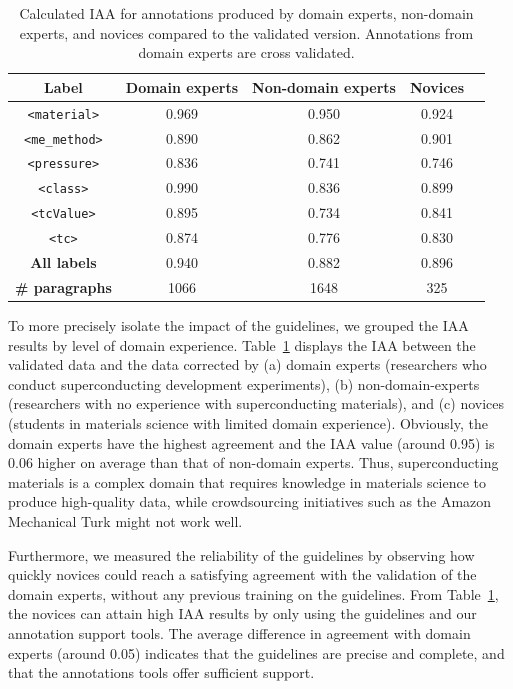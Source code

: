 \begin{table}[htbp]
    \centering
    \caption{Calculated IAA for annotations produced by domain experts, non-domain experts, and novices compared to the validated version. Annotations from domain experts are cross validated. }
    \begin{tabular}{ ccccc } 
    \toprule
        \textbf{Label} & \textbf{Domain experts} & \textbf{Non-domain experts} & \textbf{Novices}\\
    \midrule
        \texttt{<material>}     &   0.969   & 0.950    &   0.924   \\
        \texttt{<me\_method>}   &   0.890   & 0.862    &   0.901   \\
        \texttt{<pressure>}     &   0.836   & 0.741    &   0.746   \\
        \texttt{<class>}        &   0.990   & 0.836	   &   0.899   \\
        \texttt{<tcValue>}      &   0.895   & 0.734	   &   0.841   \\
        \texttt{<tc>}           &   0.874   & 0.776	   &   0.830   \\
    \midrule
        \textbf{All labels}        &	0.940   &   0.882	&      0.896   \\
    \midrule
        \textbf{\# paragraphs}  &   1066   &  1648	    &   325     \\
    \bottomrule
    \end{tabular}
   
    \label{table:comparison-iaa-nde-de}
\end{table}

To more precisely isolate the impact of the guidelines, we grouped the IAA results by level of domain experience. 
Table~\ref{table:comparison-iaa-nde-de} displays the IAA between the validated data and the data corrected by (a) domain experts (researchers who conduct superconducting development experiments), (b) non-domain-experts (researchers with no experience with superconducting materials), and (c) novices (students in materials science with limited domain experience). 
Obviously, the domain experts have the highest agreement and the IAA value (around 0.95) is 0.06 higher on average than that of non-domain experts. 
Thus, superconducting materials is a complex domain that requires knowledge in materials science to produce high-quality data, while crowdsourcing initiatives such as the Amazon Mechanical Turk might not work well. 

Furthermore, we measured the reliability of the guidelines by observing how quickly novices could reach a satisfying agreement with the validation of the domain experts, without any previous training on the guidelines.
From Table~\ref{table:comparison-iaa-nde-de}, the novices can attain high IAA results by only using the guidelines and our annotation support tools. 
The average difference in agreement with domain experts (around 0.05) indicates that the guidelines are precise and complete, and that the annotations tools offer sufficient support. 

